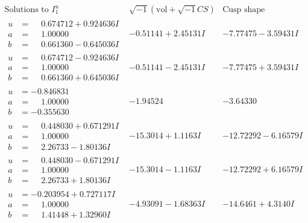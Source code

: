 \documentclass[1p]{elsarticle_modified}
\theoremstyle{definition}
\newcommand{\I}{\sqrt{-1}}
\begin{document}
$$\begin{array}{c|c|c}  
\text{Solutions to }I^u_{1}& \I (\text{vol} + \sqrt{-1}CS) & \text{Cusp shape}\\
 \hline 
\begin{aligned}
u &= \phantom{-}0.674712 + 0.924636 I \\
a &= \phantom{-}1.00000\phantom{ +0.000000I} \\
b &= \phantom{-}0.661360 - 0.645036 I\end{aligned}
 & -0.51141 + 2.45131 I & -7.77475 - 3.59431 I \\ \hline\begin{aligned}
u &= \phantom{-}0.674712 - 0.924636 I \\
a &= \phantom{-}1.00000\phantom{ +0.000000I} \\
b &= \phantom{-}0.661360 + 0.645036 I\end{aligned}
 & -0.51141 - 2.45131 I & -7.77475 + 3.59431 I \\ \hline\begin{aligned}
u &= -0.846831\phantom{ +0.000000I} \\
a &= \phantom{-}1.00000\phantom{ +0.000000I} \\
b &= -0.355630\phantom{ +0.000000I}\end{aligned}
 & -1.94524\phantom{ +0.000000I} & -3.64330\phantom{ +0.000000I} \\ \hline\begin{aligned}
u &= \phantom{-}0.448030 + 0.671291 I \\
a &= \phantom{-}1.00000\phantom{ +0.000000I} \\
b &= \phantom{-}2.26733 - 1.80136 I\end{aligned}
 & -15.3014 + 1.1163 I & -12.72292 - 6.16579 I \\ \hline\begin{aligned}
u &= \phantom{-}0.448030 - 0.671291 I \\
a &= \phantom{-}1.00000\phantom{ +0.000000I} \\
b &= \phantom{-}2.26733 + 1.80136 I\end{aligned}
 & -15.3014 - 1.1163 I & -12.72292 + 6.16579 I \\ \hline\begin{aligned}
u &= -0.203954 + 0.727117 I \\
a &= \phantom{-}1.00000\phantom{ +0.000000I} \\
b &= \phantom{-}1.41448 + 1.32960 I\end{aligned}
 & -4.93091 - 1.68363 I & -14.6461 + 4.3140 I \\ \hline\begin{aligned}

\end{aligned}
\end{array}$$
\end{document}
